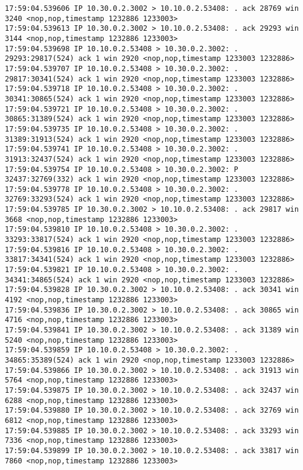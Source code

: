 \documentclass[a4paper,12pt]{article}
\begin{document}
\begin{Verbatim}
17:59:04.539606 IP 10.30.0.2.3002 > 10.10.0.2.53408: . ack 28769 win 3240 <nop,nop,timestamp 1232886 1233003>
17:59:04.539613 IP 10.30.0.2.3002 > 10.10.0.2.53408: . ack 29293 win 3144 <nop,nop,timestamp 1232886 1233003>
17:59:04.539698 IP 10.10.0.2.53408 > 10.30.0.2.3002: . 29293:29817(524) ack 1 win 2920 <nop,nop,timestamp 1233003 1232886>
17:59:04.539707 IP 10.10.0.2.53408 > 10.30.0.2.3002: . 29817:30341(524) ack 1 win 2920 <nop,nop,timestamp 1233003 1232886>
17:59:04.539718 IP 10.10.0.2.53408 > 10.30.0.2.3002: . 30341:30865(524) ack 1 win 2920 <nop,nop,timestamp 1233003 1232886>
17:59:04.539721 IP 10.10.0.2.53408 > 10.30.0.2.3002: . 30865:31389(524) ack 1 win 2920 <nop,nop,timestamp 1233003 1232886>
17:59:04.539735 IP 10.10.0.2.53408 > 10.30.0.2.3002: . 31389:31913(524) ack 1 win 2920 <nop,nop,timestamp 1233003 1232886>
17:59:04.539741 IP 10.10.0.2.53408 > 10.30.0.2.3002: . 31913:32437(524) ack 1 win 2920 <nop,nop,timestamp 1233003 1232886>
17:59:04.539754 IP 10.10.0.2.53408 > 10.30.0.2.3002: P 32437:32769(332) ack 1 win 2920 <nop,nop,timestamp 1233003 1232886>
17:59:04.539778 IP 10.10.0.2.53408 > 10.30.0.2.3002: . 32769:33293(524) ack 1 win 2920 <nop,nop,timestamp 1233003 1232886>
17:59:04.539785 IP 10.30.0.2.3002 > 10.10.0.2.53408: . ack 29817 win 3668 <nop,nop,timestamp 1232886 1233003>
17:59:04.539810 IP 10.10.0.2.53408 > 10.30.0.2.3002: . 33293:33817(524) ack 1 win 2920 <nop,nop,timestamp 1233003 1232886>
17:59:04.539816 IP 10.10.0.2.53408 > 10.30.0.2.3002: . 33817:34341(524) ack 1 win 2920 <nop,nop,timestamp 1233003 1232886>
17:59:04.539821 IP 10.10.0.2.53408 > 10.30.0.2.3002: . 34341:34865(524) ack 1 win 2920 <nop,nop,timestamp 1233003 1232886>
17:59:04.539828 IP 10.30.0.2.3002 > 10.10.0.2.53408: . ack 30341 win 4192 <nop,nop,timestamp 1232886 1233003>
17:59:04.539836 IP 10.30.0.2.3002 > 10.10.0.2.53408: . ack 30865 win 4716 <nop,nop,timestamp 1232886 1233003>
17:59:04.539841 IP 10.30.0.2.3002 > 10.10.0.2.53408: . ack 31389 win 5240 <nop,nop,timestamp 1232886 1233003>
17:59:04.539859 IP 10.10.0.2.53408 > 10.30.0.2.3002: . 34865:35389(524) ack 1 win 2920 <nop,nop,timestamp 1233003 1232886>
17:59:04.539866 IP 10.30.0.2.3002 > 10.10.0.2.53408: . ack 31913 win 5764 <nop,nop,timestamp 1232886 1233003>
17:59:04.539875 IP 10.30.0.2.3002 > 10.10.0.2.53408: . ack 32437 win 6288 <nop,nop,timestamp 1232886 1233003>
17:59:04.539880 IP 10.30.0.2.3002 > 10.10.0.2.53408: . ack 32769 win 6812 <nop,nop,timestamp 1232886 1233003>
17:59:04.539885 IP 10.30.0.2.3002 > 10.10.0.2.53408: . ack 33293 win 7336 <nop,nop,timestamp 1232886 1233003>
17:59:04.539899 IP 10.30.0.2.3002 > 10.10.0.2.53408: . ack 33817 win 7860 <nop,nop,timestamp 1232886 1233003>

\end{Verbatim}
\end{document}
